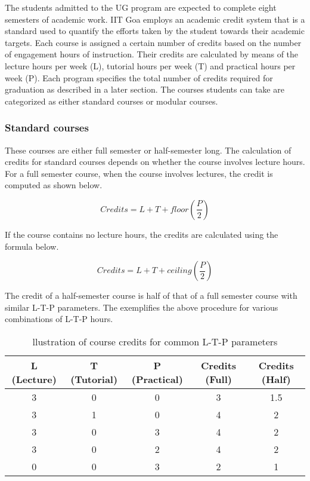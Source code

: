 The students admitted to the UG program are expected to complete eight semesters of academic work. IIT Goa employs an academic credit system that is a standard used to quantify the efforts taken by the student towards their academic targets. Each course is assigned a certain number of credits based on the number of engagement hours of instruction. Their credits are calculated by means of the lecture hours per week (L), tutorial hours per week (T) and practical hours per week (P). Each program specifies the total number of credits required for graduation as described in a later section. The courses students can take are categorized as either standard courses or modular courses.

\subsubsection{Standard courses}

These courses are either full semester or half-semester long. The calculation of credits for standard courses depends on whether the course involves lecture hours. For a full semester course, when the course involves lectures, the credit is computed as shown below.

\begin{equation}
\mathit{Credits}=L+T+\mathit{floor}\left(\frac{P}{2}\right )
\end{equation}

If the course contains no lecture hours, the credits are calculated using the formula below.


	\[Credits=L+T+ceiling(\frac{P}{2})\]


The credit of a half-semester course is half of that of a full semester course with similar L-T-P parameters. The  exemplifies the above procedure for various combinations of L-T-P hours.

\begin{table}[t]
	
	\renewcommand{\arraystretch}{1.25} 
    \centering

    \begin{tabular}{c c c c c}
    	    \toprule
    L (Lecture) & T (Tutorial) & P (Practical) & Credits (Full) & Credits (Half)\\
    
    \hline
    \hline
    
     3 & 0 & 0 & 3 & 1.5   \\
     3 & 1 & 0 & 4 & 2 \\
     3 & 0 & 3 & 4 & 2 \\
     3 & 0 & 2 & 4 & 2   \\
     0 & 0 & 3 & 2 & 1  \\
    \bottomrule
    \end{tabular}
    \caption{llustration of course credits for common L-T-P parameters}
    \label{tab:credits-example}
\end{table}

